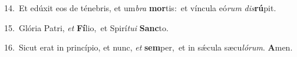 {\numbfont\textcolor{\numbcolor}{14.}}~Et edúxit eos de ténebris, et um\textit{bra} \textbf{mor}\-tis:~\star et víncula eó\textit{rum} \textit{dis}\-\textbf{rú}pit.\par
{\numbfont\textcolor{\numbcolor}{15.}}~Glória Patri, \textit{et} \textbf{Fí}\-lio,~\star et Spirí\-\textit{tu}\-\textit{i} \textbf{Sanc}\-to.\par
{\numbfont\textcolor{\numbcolor}{16.}}~Sicut erat in princípio, et nunc, \textit{et} \textbf{sem}\-per,~\star et in sǽcula sæcu\-\textit{ló}\-\textit{rum}. \textbf{A}\-men.\par
